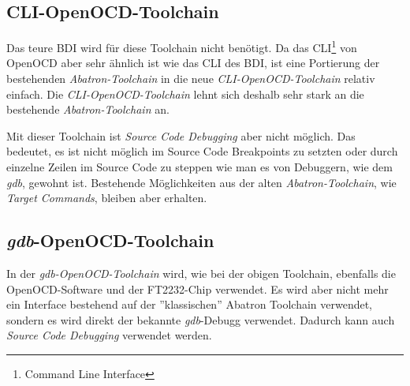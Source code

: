 \subsection{CLI-OpenOCD-Toolchain}
Das teure BDI wird für diese Toolchain nicht  benötigt.
Da das CLI\footnote{Command Line Interface} von OpenOCD aber sehr ähnlich ist wie das CLI des BDI, ist eine Portierung der bestehenden \textit{Abatron-Toolchain} in die neue \textit{CLI-OpenOCD-Toolchain} relativ einfach.
Die \textit{CLI-OpenOCD-Toolchain} lehnt sich deshalb sehr stark an die bestehende \textit{Abatron-Toolchain} an.

Mit dieser Toolchain ist \textit{Source Code Debugging} aber nicht möglich.
Das bedeutet, es ist nicht möglich im Source Code Breakpoints zu setzten oder durch einzelne Zeilen im Source Code zu steppen wie man es von Debuggern, wie dem \textit{gdb}, gewohnt ist.
Bestehende Möglichkeiten aus der alten \textit{Abatron-Toolchain}, wie \textit{Target Commands}, bleiben aber erhalten.


\subsection{\textit{gdb}-OpenOCD-Toolchain}
In der \textit{gdb-OpenOCD-Toolchain} wird, wie bei der obigen Toolchain, ebenfalls die OpenOCD-Software und der FT2232-Chip verwendet.
Es wird aber nicht mehr ein Interface bestehend auf der ''klassischen'' Abatron Toolchain verwendet, sondern es wird direkt der bekannte \textit{gdb}-Debugg verwendet.
Dadurch kann auch \textit{Source Code Debugging} verwendet werden.

